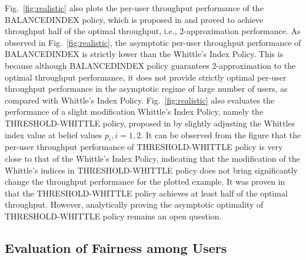 \documentclass[11pt,twocolumn]{IEEEtran}
\begin{document}
Fig.~\ref{fig:realistic} also plots the per-user throughput performance of the BALANCEDINDEX  policy, which is proposed in \cite{ApproxRMBP} and proved to achieve throughput half of the optimal throughput, i.e., 2-approximation performance. As observed in Fig.~\ref{fig:realistic}, the asymptotic per-user throughput performance of BALANCEDINDEX is strictly lower than the Whittle's Index Policy. This is because although BALANCEDINDEX policy guarantees 2-approximation to the optimal throughput performance, it does not provide strictly optimal per-user throughput performance in the asymptotic regime of large number of users, as compared with Whittle's Index Policy. Fig.~\ref{fig:realistic} also evaluates the performance of a slight modification Whittle's Index Policy, namely the THRESHOLD-WHITTLE policy, proposed in \cite{ApproxRMBP} by slightly adjusting the Whittles index value at belief values $p_i, i=1,2$. It can be observed from the figure that the per-user throughput performance of THRESHOLD-WHITTLE policy is very close to that of the Whittle's Index Policy, indicating that the modification of the Whittle's indices in THRESHOLD-WHITTLE policy does not bring significantly change the throughput performance for the plotted example. It was proven in \cite{ApproxRMBP} that the THRESHOLD-WHITTLE policy achieves at least half of the optimal  throughput. However, analytically proving the asymptotic optimality of THRESHOLD-WHITTLE policy remains an open question.

\subsection{Evaluation of Fairness among Users}
\end{document}
